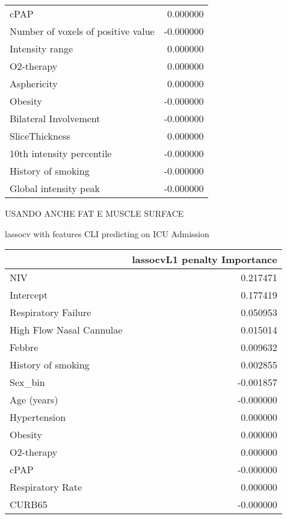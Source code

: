 {\begin{tabular}{lr}
cPAP                                &                      0.000000 \\
Number of voxels of positive value  &                     -0.000000 \\
Intensity range                     &                      0.000000 \\
O2-therapy                          &                      0.000000 \\
Asphericity                         &                      0.000000 \\
Obesity                             &                     -0.000000 \\
Bilateral Involvement               &                     -0.000000 \\
SliceThickness                      &                      0.000000 \\
10th intensity percentile           &                     -0.000000 \\
History of smoking                  &                     -0.000000 \\
Global intensity peak               &                     -0.000000 \\
\bottomrule
\end{tabular}

\large{USANDO ANCHE FAT E MUSCLE SURFACE}

lassocv with features CLI predicting on ICU Admission

\begin{tabular}{lr}
\toprule
{} &  lassocvL1 penalty Importance \\
\midrule
NIV                      &                      0.217471 \\
Intercept                &                      0.177419 \\
Respiratory Failure      &                      0.050953 \\
High Flow Nasal Cannulae &                      0.015014 \\
Febbre                   &                      0.009632 \\
History of smoking       &                      0.002855 \\
Sex\_bin                  &                     -0.001857 \\
Age (years)              &                     -0.000000 \\
Hypertension             &                      0.000000 \\
Obesity                  &                      0.000000 \\
O2-therapy               &                      0.000000 \\
cPAP                     &                     -0.000000 \\
Respiratory Rate         &                      0.000000 \\
CURB65                   &                     -0.000000 \\
\bottomrule
\end{tabular}

}
